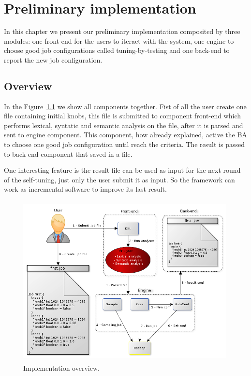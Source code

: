 \chapter{Preliminary implementation} %
\label{cha:framework}

In this chapter we present our preliminary implementation composited by three
modules: one front-end for the users to iteract with the system, one engine to
choose good job configurations called tuning-by-testing and one back-end to
report the new job configuration.

\section{Overview}

In the Figure~\ref{fig:overview} we show all components together. Fist of all the
user create one file containing initial knobs, this file is submitted to component
front-end which performs lexical, syntatic and semantic analysis on the file, after
it is parsed and sent to engine component. This component, how already explained,
active the BA to choose one good job configuration until reach the criteria. The
result is passed to back-end component that saved in a file.

One interesting feature is the result file can be used as input for the next round
of the self-tuning, just only the user submit it as input. So the framework can work
as incremental software to improve its last result.

\begin{figure}[htbp]
	\centering
	\includegraphics[width=420px,height=330px]{img/overview.png}
	\caption{Implementation overview.}\label{fig:overview}
\end{figure}


